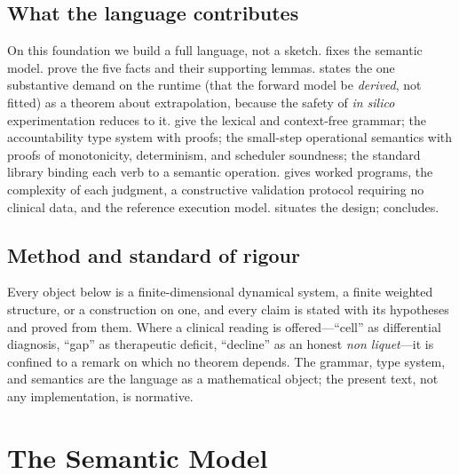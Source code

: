 \subsection{What the language contributes}

On this foundation we build a full language, not a sketch. 
fixes the semantic model.  prove the five facts and their supporting
lemmas.  states the one substantive demand on the runtime
(that the forward model be \emph{derived}, not fitted) as a theorem about
extrapolation, because the safety of \emph{in silico} experimentation reduces
to it.  give the lexical and context-free
grammar;  the accountability type system with proofs;
 the small-step operational semantics with proofs of
monotonicity, determinism, and scheduler soundness;  the
standard library binding each verb to a semantic operation. 
gives worked programs,  the complexity of each judgment,
 a constructive validation protocol requiring no clinical
data, and  the reference execution model. 
situates the design;  concludes.

\subsection{Method and standard of rigour}

Every object below is a finite-dimensional dynamical system, a finite weighted
structure, or a construction on one, and every claim is stated with its
hypotheses and proved from them. Where a clinical reading is offered---``cell''
as differential diagnosis, ``gap'' as therapeutic deficit, ``decline'' as an
honest \emph{non liquet}---it is confined to a remark on which no theorem
depends. The grammar, type system, and semantics are the language as a
mathematical object; the present text, not any implementation, is normative.

\section{The Semantic Model}
\label{cfc:sec:model}

